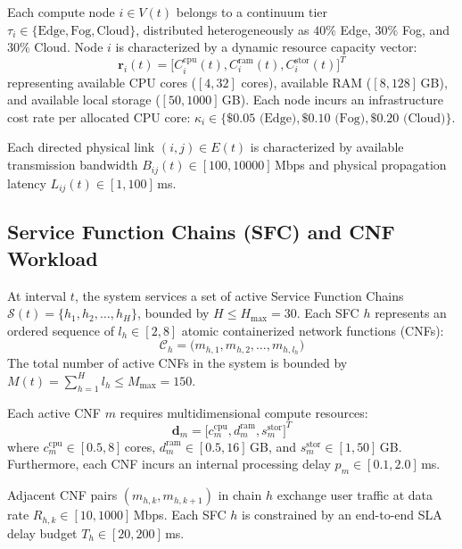 \documentclass[conference]{IEEEtran}
\begin{document}
Each compute node $i \in V(t)$ belongs to a continuum tier $\tau_i \in \{\text{Edge}, \text{Fog}, \text{Cloud}\}$, distributed heterogeneously as $40\%$ Edge, $30\%$ Fog, and $30\%$ Cloud. Node $i$ is characterized by a dynamic resource capacity vector:
\begin{equation}
\mathbf{r}_i(t) = \big[ C_i^{\text{cpu}}(t), C_i^{\text{ram}}(t), C_i^{\text{stor}}(t) \big]^T
\end{equation}
representing available CPU cores ($[4, 32]$ cores), available RAM ($[8, 128]$\,GB), and available local storage ($[50, 1000]$\,GB). Each node incurs an infrastructure cost rate per allocated CPU core: $\kappa_i \in \{\$0.05 \text{ (Edge)}, \$0.10 \text{ (Fog)}, \$0.20 \text{ (Cloud)}\}$.

Each directed physical link $(i, j) \in E(t)$ is characterized by available transmission bandwidth $B_{ij}(t) \in [100, 10000]$\,Mbps and physical propagation latency $L_{ij}(t) \in [1, 100]$\,ms.

\subsection{Service Function Chains (SFC) and CNF Workload}
At interval $t$, the system services a set of active Service Function Chains $\mathcal{S}(t) = \{h_1, h_2, \dots, h_H\}$, bounded by $H \le H_{\max} = 30$. Each SFC $h$ represents an ordered sequence of $l_h \in [2, 8]$ atomic containerized network functions (CNFs):
\begin{equation}
\mathcal{C}_h = \big( m_{h,1}, m_{h,2}, \dots, m_{h,l_h} \big)
\end{equation}
The total number of active CNFs in the system is bounded by $M(t) = \sum_{h=1}^H l_h \le M_{\max} = 150$.

Each active CNF $m$ requires multidimensional compute resources:
\begin{equation}
\mathbf{d}_m = \big[ c_m^{\text{cpu}}, d_m^{\text{ram}}, s_m^{\text{stor}} \big]^T
\end{equation}
where $c_m^{\text{cpu}} \in [0.5, 8]$\,cores, $d_m^{\text{ram}} \in [0.5, 16]$\,GB, and $s_m^{\text{stor}} \in [1, 50]$\,GB. Furthermore, each CNF incurs an internal processing delay $p_m \in [0.1, 2.0]$\,ms.

Adjacent CNF pairs $(m_{h, k}, m_{h, k+1})$ in chain $h$ exchange user traffic at data rate $R_{h, k} \in [10, 1000]$\,Mbps. Each SFC $h$ is constrained by an end-to-end SLA delay budget $T_h \in [20, 200]$\,ms.
\end{document}
